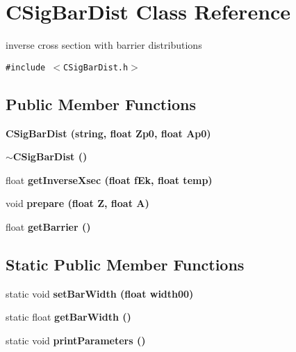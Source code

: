 \section{CSig\-Bar\-Dist Class Reference}
\label{classCSigBarDist}
inverse cross section with barrier distributions  


{\tt \#include $<$CSig\-Bar\-Dist.h$>$}

\subsection*{Public Member Functions}
\begin{CompactItemize}
\item 
\bf{CSig\-Bar\-Dist} (string, float Zp0, float Ap0)
\item 
\bf{$\sim$CSig\-Bar\-Dist} ()
\item 
float \bf{get\-Inverse\-Xsec} (float f\-Ek, float temp)
\item 
void \bf{prepare} (float \bf{Z}, float \bf{A})
\item 
float \bf{get\-Barrier} ()
\end{CompactItemize}
\subsection*{Static Public Member Functions}
\begin{CompactItemize}
\item 
static void \bf{set\-Bar\-Width} (float width00)
\item 
static float \bf{get\-Bar\-Width} ()
\item 
static void \bf{print\-Parameters} ()
\end{CompactItemize}
